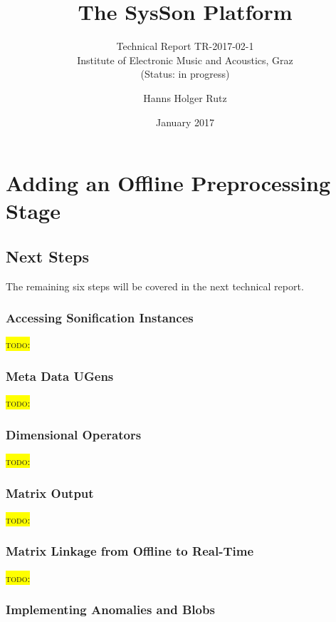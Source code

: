\documentclass[11pt,a4paper]{article}
\title{The SysSon Platform}
\subtitle{Technical Report TR-2017-02-1\\Institute of Electronic Music and Acoustics, Graz\\(Status: in progress)}
\author{Hanns Holger Rutz}
\date{January 2017}
\newcommand{\todo}[1]{\colorbox{yellow}{\textsc{todo}: #1}}
\begin{document}
\maketitle
{}
\thispagestyle{empty}
\newpage
\section{Adding an Offline Preprocessing Stage}

\subsection{Next Steps}

The remaining six steps will be covered in the next technical report.

\subsubsection{Accessing Sonification Instances}

\todo{}

\subsubsection{Meta Data UGens}

\todo{}

\subsubsection{Dimensional Operators}

\todo{}

\subsubsection{Matrix Output}

\todo{}

\subsubsection{Matrix Linkage from Offline to Real-Time}

\todo{}

\subsubsection{Implementing Anomalies and Blobs}

\end{document}
